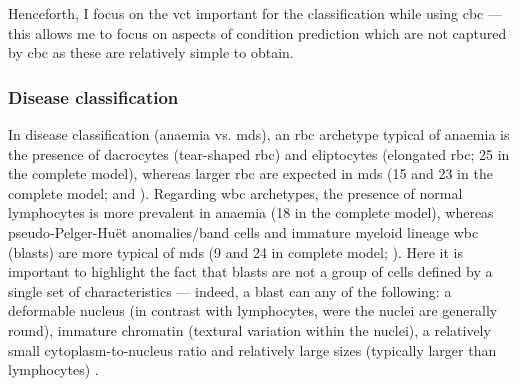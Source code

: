 Henceforth, I focus on the \ac{vct} important for the classification while using \ac{cbc} --- this allows me to focus on aspects of condition prediction which are not captured by \ac{cbc} as these are relatively simple to obtain. 

\subsubsection{Disease classification} 

In disease classification (anaemia vs. \ac{mds}), an \ac{rbc} archetype typical of anaemia is the presence of dacrocytes (tear-shaped \ac{rbc}) and eliptocytes (elongated \ac{rbc}; 25 in the complete model), whereas larger \ac{rbc} are expected in \ac{mds} (15 and 23 in the complete model;  and ). Regarding \ac{wbc} archetypes, the presence of normal lymphocytes is more prevalent in anaemia (18 in the complete model), whereas pseudo-Pelger-Huët anomalies/band cells and immature myeloid lineage \ac{wbc} (blasts) are more typical of \ac{mds} (9 and 24 in complete model; ). Here it is important to highlight the fact that blasts are not a group of cells defined by a single set of characteristics --- indeed, a blast can any of the following: a deformable nucleus (in contrast with lymphocytes, were the nuclei are generally round), immature chromatin (textural variation within the nuclei), a relatively small cytoplasm-to-nucleus ratio and relatively large sizes (typically larger than lymphocytes) \cite{Bain2004-uq,Bain2005-zg,Bain2014-oc}.

\begin{figure}[!ht]
    \label{fig:mile-vice-vcq-so-disease-classification}
\end{figure}

\begin{figure}[!ht]
    \label{fig:rbc-disease-classification-examples}
\end{figure}

